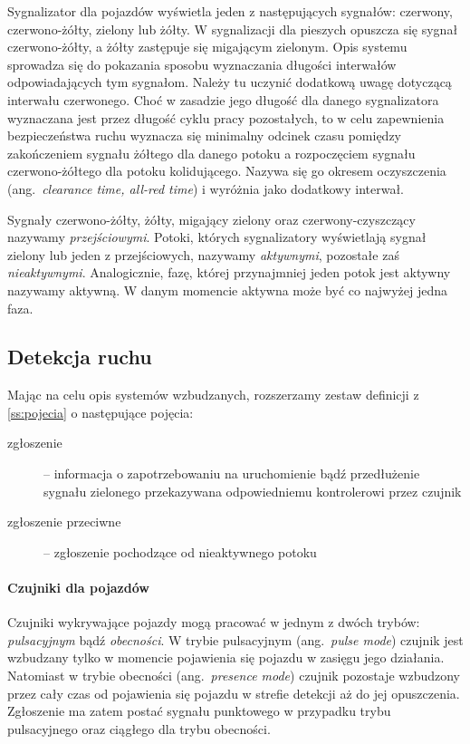 \documentclass{pracamgr}
\newcommand{\ang}[1]{(ang.~\emph{#1})}
\theoremstyle{plain}
\begin{document}
Sygnalizator dla pojazdów wyświetla jeden z następujących sygnałów:
czerwony, czerwono-żółty, zielony lub żółty. W sygnalizacji dla
pieszych opuszcza się sygnał czerwono-żółty, a żółty zastępuje się
migającym zielonym. Opis systemu sprowadza się do pokazania sposobu
wyznaczania długości interwałów odpowiadających tym sygnałom. Należy
tu uczynić dodatkową uwagę dotyczącą interwału czerwonego. Choć w
zasadzie jego długość dla danego sygnalizatora wyznaczana jest przez
długość cyklu pracy pozostałych, to w celu zapewnienia bezpieczeństwa
ruchu wyznacza się minimalny odcinek czasu pomiędzy zakończeniem
sygnału żółtego dla danego potoku a rozpoczęciem sygnału
czerwono-żółtego dla potoku kolidującego. Nazywa się go okresem
oczyszczenia \ang{clearance time, all-red time} i wyróżnia jako
dodatkowy interwał.

Sygnały czerwono-żółty, żółty, migający zielony oraz
czerwony-czyszczący nazywamy \emph{przejściowymi}. Potoki, których
sygnalizatory wyświetlają sygnał zielony lub jeden z przejściowych,
nazywamy \emph{aktywnymi}, pozostałe zaś
\emph{nieaktywnymi}. Analogicznie, fazę, której przynajmniej jeden
potok jest aktywny nazywamy aktywną. W danym momencie aktywna może być
co najwyżej jedna faza.

\subsection{Detekcja ruchu}
\label{ss:detekcja} Mając na celu opis systemów wzbudzanych,
rozszerzamy zestaw definicji z \ref{ss:pojecia} o następujące
pojęcia:
\begin{description}
  \item[zgłoszenie] -- informacja o zapotrzebowaniu na uruchomienie
bądź przedłużenie sygnału zielonego przekazywana odpowiedniemu
kontrolerowi przez czujnik
  \item[zgłoszenie przeciwne] -- zgłoszenie pochodzące od nieaktywnego
potoku
\end{description}

\paragraph{Czujniki dla pojazdów} Czujniki wykrywające pojazdy
mogą pracować w jednym z dwóch trybów:
\emph{pulsacyjnym} bądź \emph{obecności}.  W trybie pulsacyjnym
\ang{pulse mode} czujnik jest wzbudzany tylko w momencie pojawienia
się pojazdu w zasięgu jego działania.  Natomiast w trybie obecności
\ang{presence mode} czujnik pozostaje wzbudzony przez cały czas od
pojawienia się pojazdu w strefie detekcji aż do jej
opuszczenia. Zgłoszenie ma zatem postać sygnału punktowego w przypadku
trybu pulsacyjnego oraz ciągłego dla trybu obecności.
\end{document}
